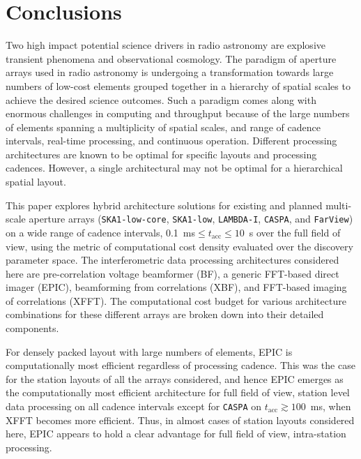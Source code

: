 \documentclass[
  journal=pasa,
  manuscript=article-type,
  year=2020,
  volume=37,
]{cup-journal}
\begin{document}
\section{Conclusions} \label{sec:conclusion}

Two high impact potential science drivers in radio astronomy are explosive transient phenomena and observational cosmology. The paradigm of aperture arrays used in radio astronomy is undergoing a transformation towards large numbers of low-cost elements grouped together in a hierarchy of spatial scales to achieve the desired science outcomes. Such a paradigm comes along with enormous challenges in computing and throughput because of the large numbers of elements spanning a multiplicity of spatial scales, and range of cadence intervals, real-time processing, and continuous operation. Different processing architectures are known to be optimal for specific layouts and processing cadences. However, a single architectural may not be optimal for a hierarchical spatial layout.

This paper explores hybrid architecture solutions for existing and planned multi-scale aperture arrays (\texttt{SKA1-low-core}, \texttt{SKA1-low}, \texttt{LAMBDA-I}, \texttt{CASPA}, and \texttt{FarView}) on a wide range of cadence intervals, 0.1~ms$\le t_\textrm{acc} \le 10$~s over the full field of view, using the metric of computational cost density evaluated over the discovery parameter space. The interferometric data processing architectures considered here are pre-correlation voltage beamformer (BF), a generic FFT-based direct imager (EPIC), beamforming from correlations (XBF), and FFT-based imaging of correlations (XFFT). The computational cost budget for various architecture combinations for these different arrays are broken down into their detailed components. 

For densely packed layout with large numbers of elements, EPIC is computationally most efficient regardless of processing cadence. This was the case for the station layouts of all the arrays considered, and hence EPIC emerges as the computationally most efficient architecture for full field of view, station level data processing on all cadence intervals except for \texttt{CASPA} on $t_\textrm{acc}\gtrsim 100$~ms, when XFFT becomes more efficient. Thus, in almost cases of station layouts considered here, EPIC appears to hold a clear advantage for full field of view, intra-station processing. 
\end{document}
